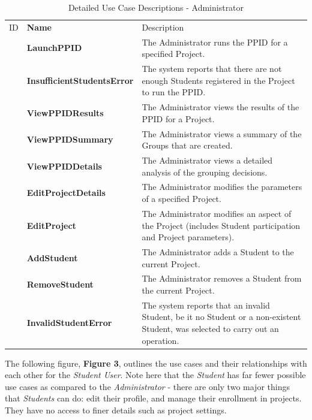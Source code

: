 \documentclass[12pt,letterpaper]{article}
\begin{document}
\begin{table}[H]
	\caption{Detailed Use Case Descriptions - Administrator}
	\begin{tabu} to 
	    \tableheader{}ID & Name & Description\\
		\launchppid{} & LaunchPPID & The Administrator runs the PPID for a specified Project.\\
		\insufficientstudentserror{} & InsufficientStudentsError & The system reports that there are not enough Students registered in the Project to run the PPID.\\
		\viewppidresults{} & ViewPPIDResults & The Administrator views the results of the PPID for a Project.\\
		\viewppidsummary{} & ViewPPIDSummary & The Administrator views a summary of the Groups that are created.\\
		\viewppiddetails{} & ViewPPIDDetails & The Administrator views a detailed analysis of the grouping decisions.\\
		\editprojectdetails{} & EditProjectDetails & The Administrator modifies the parameters of a specified Project.\\
		\editproject{} & EditProject & The Administrator modifies an aspect of the Project (includes Student participation and Project parameters).\\
		\addstudent{} & AddStudent & The Administrator adds a Student to the current Project.\\
		\removestudent{} & RemoveStudent & The Administrator removes a Student from the current Project.\\
		\invalidstudenterror{} & InvalidStudentError & The system reports that an invalid Student, be it no Student or a non-existent Student, 
		was selected to carry out an operation.\\
	\end{tabu}
\end{table}

The following figure, {\bf Figure 3}, outlines the use cases and their relationships with each other for the {\it Student User}. Note here that the {\it Student} has far fewer possible use cases
as compared to the {\it Administrator} - there are only two major things that {\it Students} can do: edit their profile, and manage their enrollment in projects. They have no 
access to finer details such as project settings. 
\end{document}
